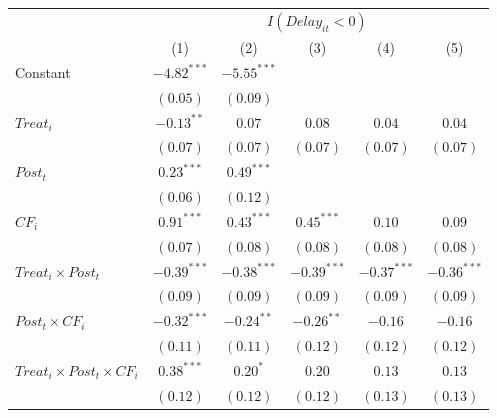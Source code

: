 \documentclass[
]{article}
\begin{document}
\begin{table}
\begin{center}
\begin{tabular}{l c c c c c}
\hline
 & \multicolumn{5}{c}{$I(Delay_{it}<0)$} \\
\cline{2-6}
 & (1) & (2) & (3) & (4) & (5) \\
\hline
Constant                                   & $-4.82^{***}$ & $-5.55^{***}$ &               &               &               \\
                                           & $(0.05)$      & $(0.09)$      &               &               &               \\
$Treat_i$                                  & $-0.13^{**}$  & $0.07$        & $0.08$        & $0.04$        & $0.04$        \\
                                           & $(0.07)$      & $(0.07)$      & $(0.07)$      & $(0.07)$      & $(0.07)$      \\
$Post_t$                                   & $0.23^{***}$  & $0.49^{***}$  &               &               &               \\
                                           & $(0.06)$      & $(0.12)$      &               &               &               \\
$CF_i$                                     & $0.91^{***}$  & $0.43^{***}$  & $0.45^{***}$  & $0.10$        & $0.09$        \\
                                           & $(0.07)$      & $(0.08)$      & $(0.08)$      & $(0.08)$      & $(0.08)$      \\
$Treat_i \times Post_t$                    & $-0.39^{***}$ & $-0.38^{***}$ & $-0.39^{***}$ & $-0.37^{***}$ & $-0.36^{***}$ \\
                                           & $(0.09)$      & $(0.09)$      & $(0.09)$      & $(0.09)$      & $(0.09)$      \\
$Post_t \times CF_i$                       & $-0.32^{***}$ & $-0.24^{**}$  & $-0.26^{**}$  & $-0.16$       & $-0.16$       \\
                                           & $(0.11)$      & $(0.11)$      & $(0.12)$      & $(0.12)$      & $(0.12)$      \\
$Treat_i \times Post_t \times CF_i$        & $0.38^{***}$  & $0.20^{*}$    & $0.20$        & $0.13$        & $0.13$        \\
                                           & $(0.12)$      & $(0.12)$      & $(0.12)$      & $(0.13)$      & $(0.13)$      \\

\end{tabular}
\end{center}
\end{table}
\end{document}
